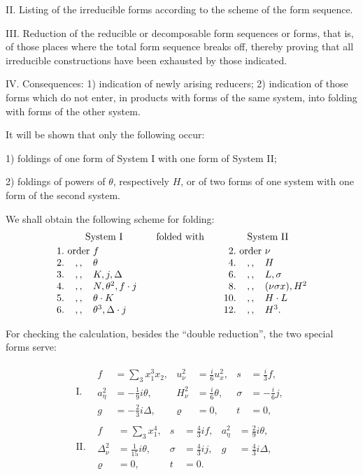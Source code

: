 \documentclass[11pt]{article}
\newcommand{\A}{\Delta}
\begin{document}
II. Listing of the irreducible forms according to the scheme of the form sequence.

III. Reduction of the reducible or decomposable form sequences or forms, that is, of those places where the total form sequence breaks off, thereby proving that all irreducible constructions have been exhausted by those indicated.

IV. Consequences: 1) indication of newly arising reducers; 2) indication of those forms which do not enter, in products with forms of the same system, into folding with forms of the other system.

It will be shown that only the following occur:

1) foldings of one form of System I with one form of System II;

2) foldings of powers of $\theta$, respectively $H$, or of two forms of one system with one form of the second system.

We shall obtain the following scheme for folding:
\[
\begin{array}{r@{\ }c@{\ }l@{\qquad}c@{\qquad}r@{\ }c@{\ }l}
\multicolumn{3}{c}{\text{System I}} & \text{folded with} & \multicolumn{3}{c}{\text{System II}}\\[0.25em]
1. & \text{order} & f & & 2. & \text{order} & \nu\\
2. & ,, & \theta & & 4. & ,, & H\\
3. & ,, & K,j,\A & & 6. & ,, & L,\sigma\\
4. & ,, & N,\theta^2,f\cdot j & & 8. & ,, & (\nu\sigma x),H^2\\
5. & ,, & \theta\cdot K & & 10. & ,, & H\cdot L\\
6. & ,, & \theta^3,\A\cdot j & & 12. & ,, & H^3.
\end{array}
\]

For checking the calculation, besides the ``double reduction'', the two special forms serve:


\[
\begin{array}{ll}
\text{I.}&\begin{array}{rlrlrl}
f&=\displaystyle\sum_3x_1^3x_2,& u_\nu^2&=\frac{i}{6}u_x^2,& s&=\frac{i}{3}f,\\
a_\eta^2&=-\frac19 i\theta,& H_\nu^2&=\frac{i}{6}\theta,& \sigma&=-\frac{i}{6}j,\\
g&=-\frac23i\Delta,& \varrho&=0,& t&=0,
\end{array}\\[1.2em]
\text{II.}&\begin{array}{rlrlrl}
f&=\displaystyle\sum_3x_1^4,& s&=\frac43if,& a_\eta^2&=\frac29i\theta,\\
\Delta_\nu^2&=\frac1{15}i\theta,& \sigma&=\frac43ij,& g&=\frac43i\Delta,\\
\varrho&=0,& t&=0.
\end{array}
\end{array}
\]
\end{document}
